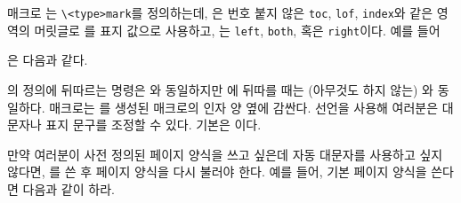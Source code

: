 매크로 \cmd{\createplainmark}는 \verb|\<type>mark|를 정의하는데, 은
번호 붙지 않은 \texttt{toc}, \texttt{lof}, \texttt{index}와 같은 영역의
머릿글로 를 표지 값으로 사용하고, 는 \texttt{left},
\texttt{both}, 혹은 \texttt{right}이다.
예를 들어
\begin{lcode}
\end{lcode}
은 다음과 같다.
\begin{lcode}
\def\tocmark{\markboth{\memUChead{\contentsname}}{}}
\def\lotmark{\markright{\memUChead{\listtablename}}}
\def\lofmark{\markboth{\memUChead{\bibname}}{\memUChead{\bibname}}}
\end{lcode}

\cmd{\uppercaseheads}의 정의에 뒤따르는 \cmd{\memUChead} 명령은
\cmd{\MakeUppercase}와 동일하지만 \cmd{\nouppercaseheads}에 뒤따를 때는
(아무것도 하지 않는) \cmd{\relax}와 동일하다.
\cmd{\createplainmark} 매크로는 \cmd{\memUChead}를 생성된 
매크로의  인자 양 옆에 감싼다.
 선언을 사용해 여러분은 대문자나 표지 문구를 조정할 수
있다.
기본은 \cmd{\uppercaseheads}이다.

만약 여러분이 사전 정의된 페이지 양식을 쓰고 싶은데 자동 대문자를 사용하고 싶지
않다면, 를 쓴 후 페이지 양식을 다시 불러야 한다.
예를 들어,  기본 페이지 양식을 쓴다면 다음과 같이 하라.
\begin{lcode}
  \nouppercaseheads
  \pagestyle{headings}
\end{lcode}


